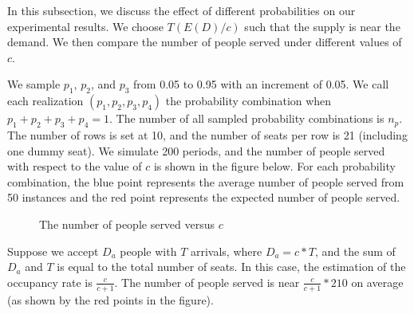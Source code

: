 In this subsection, we discuss the effect of different probabilities on our experimental results. We choose $T(E(D)/c)$ such that the supply is near the demand. We then compare the number of people served under different values of $c$.



We sample $p_1$, $p_2$, and $p_3$ from 0.05 to 0.95 with an increment of 0.05. We call each realization $(p_1, p_2, p_3, p_4)$ the probability combination when $p_1 + p_2 + p_3 + p_4 = 1$.
The number of all sampled probability combinations is $n_p$. The number of rows is set at 10, and the number of seats per row is 21 (including one dummy seat). We simulate 200 periods, and the number of people served with respect to the value of $c$ is shown in the figure below. For each probability combination, the blue point represents the average number of people served from 50 instances and the red point represents the expected number of people served.


\begin{figure}[h]
  \centering
  \caption{The number of people served versus $c$}
\end{figure}

Suppose we accept $D_a$ people with $T$ arrivals, where $D_a = c * T$, and the sum of $D_a$ and $T$ is equal to the total number of seats. In this case, the estimation of the occupancy rate is $\frac{c}{c+1}$. The number of people served is near $\frac{c}{c+1} * 210$ on average (as shown by the red points in the figure).

